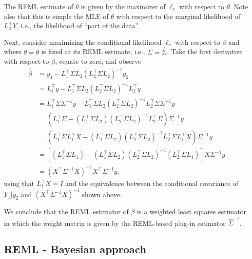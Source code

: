 \documentclass[
]{book}
\begin{document}
The REML estimate of \(\theta\) is given by the maximizer of \(\ell_r\) with respect to \(\theta\). Note also that this is simple the MLE of \(\theta\) with respect to the marginal likelihood of \(L_2^\top Y\), i.e., the likelihood of ``part of the data''.

Next, consider maximizing the conditional likelihood \(\ell_c\) with respect to \(\beta\) and where \(\theta=\hat\theta\) is fixed at its REML estimate, i.e., \(\Sigma = \hat\Sigma\). Take the first derivative with respect to \(\beta\), equate to zero, and observe
\begin{align*}
\hat\beta &= y_1 - L_1^\top \Sigma L_2(L_2^\top \Sigma L_2)^{-1}y_2\\
&= L_1^\top y - L_1^\top \Sigma L_2(L_2^\top \Sigma L_2)^{-1}L_2^\top y\\
&= L_1^\top \Sigma \Sigma^{-1}y - L_1^\top \Sigma L_2(L_2^\top \Sigma L_2)^{-1}L_2^\top \Sigma\Sigma^{-1}y\\
& = (L_1^\top \Sigma - (L_1^\top \Sigma L_2)(L_2^\top \Sigma L_2)^{-1}L_2^\top \Sigma)\Sigma^{-1}y\\
& = (L_1^\top \Sigma L_1^\top X - (L_1^\top \Sigma L_2)(L_2^\top \Sigma L_2)^{-1}L_2^\top \Sigma L_1^\top X)\Sigma^{-1}y\\
& = [(L_1^\top \Sigma L_1)-(L_1^\top \Sigma L_2)(L_2^\top \Sigma L_2)^{-1}(L_2^\top \Sigma L_1)]X\Sigma^{-1}y\\
& = (X^\top \Sigma^{-1}X)^{-1}X^\top \Sigma^{-1}y,
\end{align*}
using that \(L_1^\top X = I\) and the equivalence between the conditional covariance of \(Y_1|y_2\) and \((X^\top \Sigma^{-1}X)^{-1}\) shown above.

We conclude that the REML estimator of \(\beta\) is a weighted least squares estimator in which the weight matrix is given by the REML-based plug-in estimator \(\hat\Sigma^{-1}\).

\hypertarget{reml---bayesian-approach}{%
\subsection{REML - Bayesian approach}\label{reml---bayesian-approach}}
\end{document}

